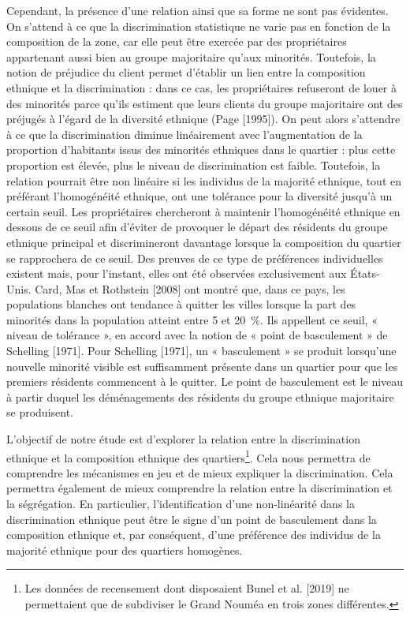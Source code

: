 \documentclass{Revue-economique} %
\begin{document}
\begin{Article}
Cependant, la présence d’une relation ainsi que sa forme ne sont pas évidentes. On s’attend à ce que la discrimination statistique ne varie pas en fonction de la composition de la zone, car elle peut être exercée par des propriétaires appartenant aussi bien au groupe majoritaire qu’aux minorités. Toutefois, la notion de préjudice du client permet d’établir un lien entre la composition ethnique et la discrimination : dans ce cas, les propriétaires refuseront de louer à des minorités parce qu’ils estiment que leurs clients du groupe majoritaire ont des préjugés à l’égard de la diversité ethnique (Page [1995]). On peut alors s’attendre à ce que la discrimination diminue linéairement avec l’augmentation de la proportion d’habitants issus des minorités ethniques dans le quartier : plus cette proportion est élevée, plus le niveau de discrimination est faible. Toutefois, la relation pourrait être non linéaire si les individus de la majorité ethnique, tout en préférant l’homogénéité ethnique, ont une tolérance pour la diversité jusqu’à un certain seuil. Les propriétaires chercheront à maintenir l’homogénéité ethnique en dessous de ce seuil afin d’éviter de provoquer le départ des résidents du groupe ethnique principal et discrimineront davantage lorsque la composition du quartier se rapprochera de ce seuil. Des preuves de ce type de préférences individuelles existent mais, pour l’instant, elles ont été observées exclusivement aux États-Unis. Card, Mas et Rothstein [2008] ont montré que, dans ce pays, les populations blanches ont tendance à quitter les villes lorsque la part des minorités dans la population atteint entre 5 et 20~\%. Ils appellent ce seuil, « niveau de tolérance », en accord avec la notion de « point de basculement » de Schelling [1971]. Pour Schelling [1971], un « basculement » se produit lorsqu’une nouvelle minorité visible est suffisamment présente dans un quartier pour que les premiers résidents commencent à le quitter. Le point de basculement est le niveau à partir duquel les déménagements des résidents du groupe ethnique majoritaire se produisent.

L’objectif de notre étude est d’explorer la relation entre la discrimination ethnique et la composition ethnique des quartiers\footnote{Les données de recensement dont disposaient Bunel et al. [2019] ne permettaient que de subdiviser le Grand Nouméa en trois zones différentes.}. Cela nous permettra de comprendre les mécanismes en jeu et de mieux expliquer la discrimination. Cela permettra également de mieux comprendre la relation entre la discrimination et la ségrégation. En particulier, l’identification d’une non-linéarité dans la discrimination ethnique peut être le signe d’un point de basculement dans la composition ethnique et, par conséquent, d’une préférence des individus de la majorité ethnique pour des quartiers homogènes.


\end{Article}
\end{document}
